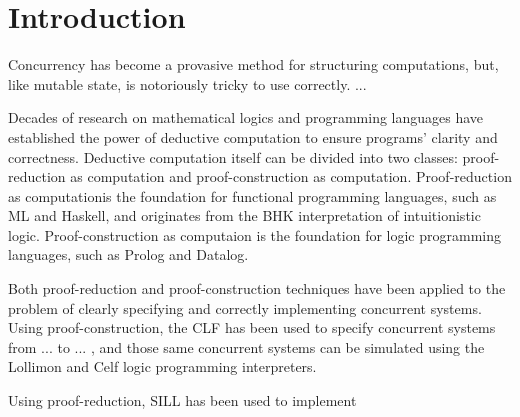 \section{Introduction}\label{sec:introduction}

Concurrency has become a provasive method for structuring computations, but, like mutable state, is notoriously tricky to use correctly.
...

Decades of research on mathematical logics and programming languages have established the power of deductive computation to ensure programs' clarity and correctness.
Deductive computation itself can be divided into two classes: proof-reduction as computation and proof-construction as computation.
Proof-reduction as computationis the foundation for functional programming languages, such as ML and Haskell, and originates from the BHK interpretation of intuitionistic logic.
Proof-construction as computaion is the foundation for logic programming languages, such as Prolog and Datalog.

Both proof-reduction and proof-construction techniques have been applied to the problem of clearly specifying and correctly implementing concurrent systems.
Using proof-construction, the \ac{CLF} \autocite{?} has been used to specify concurrent systems from ... to ... , and  those same concurrent systems can be simulated using the Lollimon and Celf logic programming interpreters.

Using proof-reduction, SILL has been used to implement 

